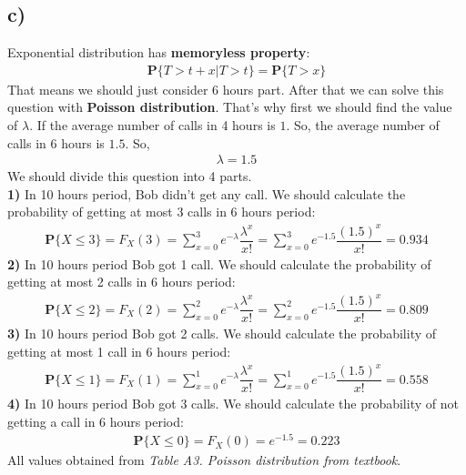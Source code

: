 \documentclass[12pt]{article}
\begin{document}
\subsection*{c)}
Exponential distribution has \textbf{memoryless property}:
\begin{equation}
    \begin{split}
        \textbf{P}\{T>t+x|T>t\} = \textbf{P}\{T>x\}
    \end{split}
\end{equation}
That means we should just consider 6 hours part. After that we can solve this question with \textbf{Poisson distribution}. That's why first we should find the value of $\lambda$. If the average number of calls in 4 hours is $1$. So, the average number of calls in 6 hours is $1.5$. So,
\begin{equation}
    \begin{split}
        \lambda = 1.5
    \end{split}
\end{equation}
We should divide this question into 4 parts.\\
\textbf{1)} In 10 hours period, Bob didn't get any call. We should calculate the probability of getting at most 3 calls in 6 hours period:
\begin{equation}
    \begin{split}
        \textbf{P}\{X \leq 3 \} = F_{X}(3) = \sum_{x = 0}^{3} e^{- \lambda} \dfrac{\lambda^x}{x!} = \sum_{x = 0}^{3} e^{- 1.5} \dfrac{\left(1.5\right)^x}{x!} = 0.934
    \end{split}
\end{equation}
\textbf{2)} In 10 hours period Bob got 1 call. We should calculate the probability of getting at most 2 calls in 6 hours period: 
\begin{equation}
    \begin{split}
        \textbf{P}\{X \leq 2 \} = F_{X}(2) = \sum_{x = 0}^{2} e^{- \lambda} \dfrac{\lambda^x}{x!} = \sum_{x = 0}^{2} e^{- 1.5} \dfrac{\left(1.5\right)^x}{x!} = 0.809
    \end{split}
\end{equation}
\textbf{3)} In 10 hours period Bob got 2 calls. We should calculate the probability of getting at most 1 call in 6 hours period: 
\begin{equation}
    \begin{split}
        \textbf{P}\{X \leq 1 \} = F_{X}(1) = \sum_{x = 0}^{1} e^{- \lambda} \dfrac{\lambda^x}{x!} = \sum_{x = 0}^{1} e^{- 1.5} \dfrac{\left(1.5\right)^x}{x!} = 0.558
    \end{split}
\end{equation}
\textbf{4)} In 10 hours period Bob got 3 calls. We should calculate the probability of not getting a call in 6 hours period: 
\begin{equation}
    \begin{split}
        \textbf{P}\{X \leq 0 \} = F_{X}(0) = e^{- 1.5} = 0.223
    \end{split}
\end{equation}
All values obtained from \textit{Table A3. Poisson distribution from textbook}.
\end{document}
